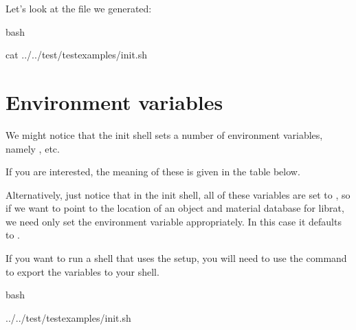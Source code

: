 \documentclass[letterpaper,10pt,english]{sphinxmanual}
\begin{document}
Let’s look at the file we generated:

{
\begin{sphinxVerbatim}[commandchars=\\\{\}]
\llap{\color{nbsphinxin}[2]:\,\hspace{\fboxrule}\hspace{\fboxsep}}\PYGZpc{}\PYGZpc{}bash

cat ../../test/test\PYGZus{}examples/init.sh
\end{sphinxVerbatim}
}


\section{Environment variables}
\label{\detokenize{Chapter1:Environment-variables}}
We might notice that the init shell sets a number of environment variables, namely ,  etc.

If you are interested, the meaning of these is given in the table below.

Alternatively, just notice that in the init shell, all of these variables are set to , so if we want to point to the location of an object and material database for librat, we need only set the environment variable  appropriately. In this case it defaults to .

If you want to run a shell that uses the  setup, you will need to use the command  to export the variables to your shell.

{
\begin{sphinxVerbatim}[commandchars=\\\{\}]
\llap{\color{nbsphinxin}[3]:\,\hspace{\fboxrule}\hspace{\fboxsep}}\PYGZpc{}\PYGZpc{}bash

 ../../test/test\PYGZus{}examples/init.sh

 
\end{sphinxVerbatim}
}
\end{document}
